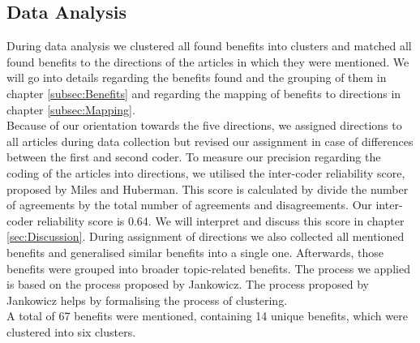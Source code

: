 \subsection{Data Analysis}
During data analysis we clustered all found benefits into clusters and matched all found benefits to the directions of the articles in which they were mentioned. We will go into details regarding the benefits found and the grouping of them in chapter \ref{subsec:Benefits} and regarding the mapping of benefits to directions in chapter \ref{subsec:Mapping}.\\
Because of our orientation towards the five directions, we assigned directions to all articles during data collection but revised our assignment in case of differences between the first and second coder. To measure our precision regarding the coding of the articles into directions, we utilised the inter-coder reliability score, proposed by Miles and Huberman.\autocite[cf.][46]{Miles.1994} This score is calculated by divide the number of agreements by the total number of agreements and disagreements. Our inter-coder reliability score is 0.64. We will interpret and discuss this score in chapter \ref{sec:Discussion}. During assignment of directions we also collected all mentioned benefits and generalised similar benefits into a single one. Afterwards, those benefits were grouped into broader topic-related benefits. The process we applied is based on the process proposed by Jankowicz.\autocite[cf.][149]{Jankowicz.2004} The process proposed by Jankowicz helps by formalising the process of clustering.\\
A total of 67 benefits were mentioned, containing 14 unique benefits, which were clustered into six clusters.